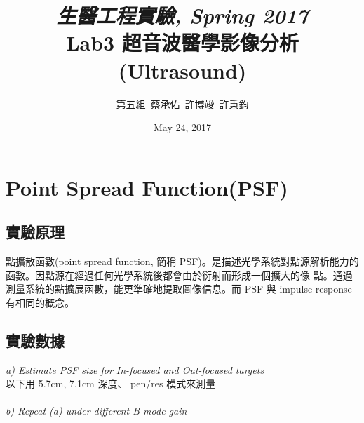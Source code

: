 \documentclass{article}
\title{\emph{生醫工程實驗, Spring 2017}\\ Lab3 超音波醫學影像分析(Ultrasound)}
\author{第五組\ 蔡承佑\ 許博竣\ 許秉鈞}
\date{May 24, 2017} %
\begin{document}
\maketitle


\section{Point Spread Function(PSF)}
\subsection{實驗原理}

點擴散函數(point spread function, 簡稱 PSF)。是描述光學系統對點源解析能力的函數。因點源在經過任何光學系統後都會由於衍射而形成一個擴大的像 點。通過測量系統的點擴展函數，能更準確地提取圖像信息。而 PSF 與 impulse response 有相同的概念。

\subsection{實驗數據}
\emph{a) Estimate PSF size for In-focused and Out-focused targets}  \\
以下用 5.7cm, 7.1cm 深度、 pen/res 模式來測量\\
\\
\emph{b) Repeat (a) under different B-mode gain} \\
\end{document}
